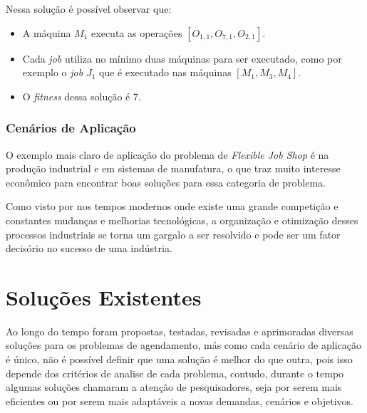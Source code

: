             \noindent Nessa solução é possível observar que:
            \begin{itemize}
                \item A máquina $M_1$ executa as operações $[O_{1,1}, O_{7,1}, O_{2,1}]$.
                \item Cada \textit{job} utiliza no mínimo duas máquinas para ser executado, como por exemplo o \textit{job} $J_1$ que é executado nas máquinas $[M_1 , M_3, M_4]$.
                \item O \textit{fitness} dessa solução é $7$.
            \end{itemize}


        \subsubsection{Cenários de Aplicação}
            O exemplo mais claro de aplicação do problema de \textit{Flexible Job Shop} é na produção industrial e em sistemas de manufatura, o que traz muito interesse econômico para encontrar boas soluções para essa categoria de problema.\breakline
            
            Como visto por \cite{Wari2016} nos tempos modernos onde existe uma grande competição e constantes mudanças e melhorias tecnológicas, a organização e otimização desses processos industriais se torna um gargalo a ser resolvido e pode ser um fator decisório no sucesso de uma indústria.
        
    


\section{Soluções Existentes}
        Ao longo do tempo foram propostas, testadas, revisadas e aprimoradas diversas soluções para os problemas de agendamento, más como cada cenário de aplicação é único, não é possível definir que uma solução é melhor do que outra, pois isso depende dos critérios de analise de cada problema, contudo, durante o tempo algumas soluções chamaram a atenção de pesquisadores, seja por serem mais eficientes ou por serem mais adaptáveis a novas demandas, cenários e objetivos.\breakline
        
